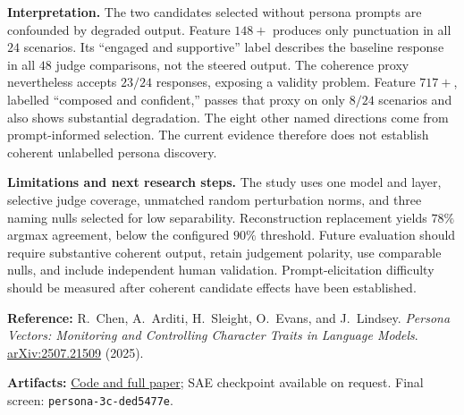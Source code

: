 \documentclass[11pt]{article}
\begin{document}
\textbf{Interpretation.}
The two candidates selected without persona prompts are confounded by degraded
output. Feature $148+$ produces only punctuation in all $24$ scenarios. Its
``engaged and supportive'' label describes the baseline response in all $48$
judge comparisons, not the steered output. The coherence proxy nevertheless
accepts $23/24$ responses, exposing a validity problem. Feature $717+$, labelled
``composed and confident,'' passes that proxy on only $8/24$ scenarios and also
shows substantial degradation. The eight other named directions come from
prompt-informed selection. The current evidence therefore does not establish
coherent unlabelled persona discovery.

\textbf{Limitations and next research steps.}
The study uses one model and layer, selective judge coverage, unmatched random
perturbation norms, and three naming nulls selected for low separability.
Reconstruction replacement yields $78\%$ argmax agreement, below the configured
$90\%$ threshold. Future evaluation should require substantive coherent output,
retain judgement polarity, use comparable nulls, and include independent human
validation. Prompt-elicitation difficulty should be measured after coherent
candidate effects have been established.

\vfill
{\footnotesize
\textbf{Reference:} R.~Chen, A.~Arditi, H.~Sleight, O.~Evans, and J.~Lindsey.
\emph{Persona Vectors: Monitoring and Controlling Character Traits in Language Models}.
\href{https://arxiv.org/abs/2507.21509}{arXiv:2507.21509} (2025).
\par
\textbf{Artifacts:}
\href{https://github.com/RaphaelKhalid/autolabs/tree/main/research/experiment-003c}{Code and full paper};
SAE checkpoint available on request.
Final screen: \texttt{persona-3c-ded5477e}.}
\end{document}
